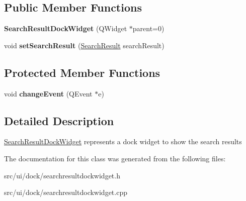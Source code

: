 \subsection*{Public Member Functions}
\begin{DoxyCompactItemize}
\item 
\hypertarget{classSearchResultDockWidget_a0b18b604a90f76ad0da19181384572ef}{
{\bfseries SearchResultDockWidget} (QWidget $\ast$parent=0)}
\label{classSearchResultDockWidget_a0b18b604a90f76ad0da19181384572ef}

\item 
\hypertarget{classSearchResultDockWidget_aefcfe85871957014c19e01ed3f48e8fc}{
void {\bfseries setSearchResult} (\hyperlink{classSearchResult}{SearchResult} searchResult)}
\label{classSearchResultDockWidget_aefcfe85871957014c19e01ed3f48e8fc}

\end{DoxyCompactItemize}
\subsection*{Protected Member Functions}
\begin{DoxyCompactItemize}
\item 
\hypertarget{classSearchResultDockWidget_afc888e356be546e31289e8113df210f4}{
void {\bfseries changeEvent} (QEvent $\ast$e)}
\label{classSearchResultDockWidget_afc888e356be546e31289e8113df210f4}

\end{DoxyCompactItemize}


\subsection{Detailed Description}
\hyperlink{classSearchResultDockWidget}{SearchResultDockWidget} represents a dock widget to show the search results 

The documentation for this class was generated from the following files:\begin{DoxyCompactItemize}
\item 
src/ui/dock/searchresultdockwidget.h\item 
src/ui/dock/searchresultdockwidget.cpp\end{DoxyCompactItemize}
